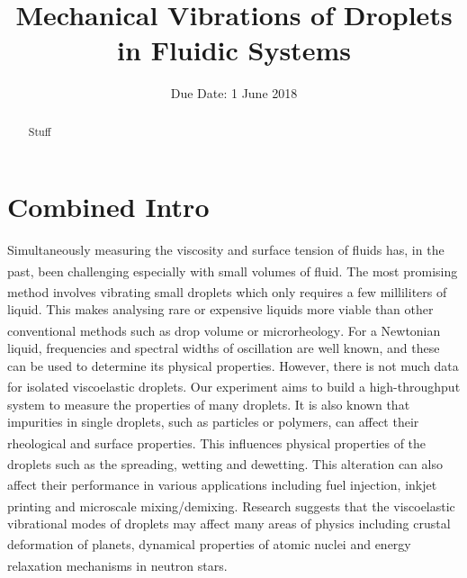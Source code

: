 \documentclass{physics_article_B}
\title{Mechanical Vibrations of Droplets in Fluidic Systems}
\date{Due Date: 1 June 2018}
\begin{document}
	
\setcounter{page}{0}
%

\begin{abstract}
	\large{Stuff
}
\end{abstract}
	

\tableofcontents

\setcounter{page}{1}
	
\newpage
{} 
\setcounter{page}{1}


\section{Combined Intro\label{sect:theory1}}

Simultaneously measuring the viscosity and surface tension of fluids has, in the past, been challenging especially with small volumes of fluid\textsuperscript{\cite{harrold}}. The most promising method involves vibrating small droplets\textsuperscript{\cite{harrold}} which only requires a few milliliters of liquid. This makes analysing rare or expensive liquids more viable than other conventional methods such as drop volume or microrheology\textsuperscript{\cite{harrold2}}. For a Newtonian liquid, frequencies and spectral widths of oscillation are well known, and these can be used to determine its physical properties. However, there is not much data for isolated viscoelastic droplets\textsuperscript{\cite{temperton}}. Our experiment aims to build a high-throughput system to measure the properties of many droplets. It is also known that impurities in single droplets, such as particles or polymers, can affect their rheological and surface properties\textsuperscript{\cite{temperton}}. This influences physical properties of the droplets such as the spreading, wetting and dewetting\textsuperscript{\cite{bergeron}}. This alteration can also affect their performance in various applications including fuel injection\textsuperscript{\cite{vukasinovic}}, inkjet printing and microscale mixing/demixing\textsuperscript{\cite{mugele}}. Research suggests that the viscoelastic vibrational modes of droplets may affect many areas of physics including crustal deformation of planets\textsuperscript{\cite{pollitz}}, dynamical properties of atomic nuclei\textsuperscript{\cite{wong}} and energy relaxation mechanisms in neutron stars\textsuperscript{\cite{bastrukov}}. 
\end{document}
